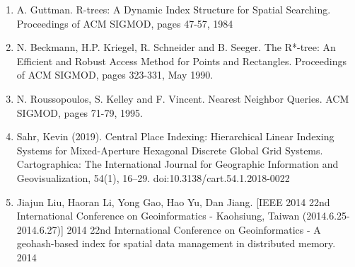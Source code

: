 %




\begin{enumerate}
    \item A. Guttman. R-trees: A Dynamic Index Structure for Spatial Searching. Proceedings of ACM SIGMOD, pages 47-57, 1984
    \item N. Beckmann, H.P. Kriegel, R. Schneider and B. Seeger. The R*-tree: An Efficient and Robust Access Method for Points and Rectangles. Proceedings of ACM SIGMOD, pages 323-331, May 1990.
    \item N. Roussopoulos, S. Kelley and F. Vincent. Nearest Neighbor Queries. ACM SIGMOD, pages 71-79, 1995.
    \item Sahr, Kevin (2019). Central Place Indexing: Hierarchical Linear Indexing Systems for Mixed-Aperture Hexagonal Discrete Global Grid Systems. Cartographica: The International Journal for Geographic Information and Geovisualization, 54(1), 16–29. doi:10.3138/cart.54.1.2018-0022
    \item  Jiajun Liu, Haoran Li, Yong Gao, Hao Yu, Dan Jiang. [IEEE 2014 22nd International Conference on Geoinformatics - Kaohsiung, Taiwan (2014.6.25-2014.6.27)] 2014 22nd International Conference on Geoinformatics - A geohash-based index for spatial data management in distributed memory. 2014

\end{enumerate}

